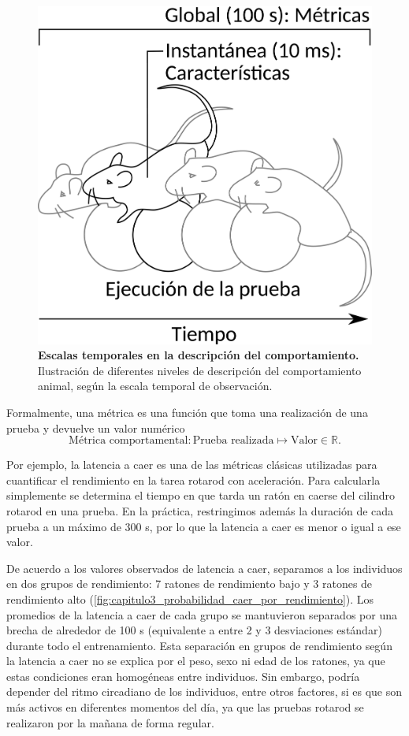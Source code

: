 \begin{figure}[htbp]
    \centering
    \includegraphics[width=0.45\linewidth]{figuras/capitulo3/representacion_comportamiento.pdf}
    \caption{\textbf{Escalas temporales en la descripción del comportamiento.} Ilustración de diferentes niveles de descripción del comportamiento animal, según la escala temporal de observación.}
    \label{fig:capitulo3_representacion_comportamiento}
\end{figure}

Formalmente, una métrica es una función que toma una realización de una prueba y devuelve un valor numérico
\begin{equation*}
    \text{Métrica comportamental}: \text{Prueba realizada} \mapsto \text{Valor} \in \mathbb{R}.
\end{equation*}

Por ejemplo, la latencia a caer es una de las métricas clásicas utilizadas para cuantificar el rendimiento en la tarea rotarod con aceleración. Para calcularla simplemente se determina el tiempo en que tarda un ratón en caerse del cilindro rotarod en una prueba. En la práctica, restringimos además la duración de cada prueba a un máximo de $300$ s, por lo que la latencia a caer es menor o igual a ese valor.

\clearpage

De acuerdo a los valores observados de latencia a caer, separamos a los individuos en dos grupos de rendimiento: 7 ratones de rendimiento bajo y 3 ratones de rendimiento alto (\autoref{fig:capitulo3_probabilidad_caer_por_rendimiento}). Los promedios de la latencia a caer de cada grupo se mantuvieron separados por una brecha de alrededor de 100 s (equivalente a entre 2 y 3 desviaciones estándar) durante todo el entrenamiento. Esta separación en grupos de rendimiento según la latencia a caer no se explica por el peso, sexo ni edad de los ratones, ya que estas condiciones eran homogéneas entre individuos. Sin embargo, podría depender del ritmo circadiano de los individuos, entre otros factores, si es que son más activos en diferentes momentos del día, ya que las pruebas rotarod se realizaron por la mañana de forma regular.

